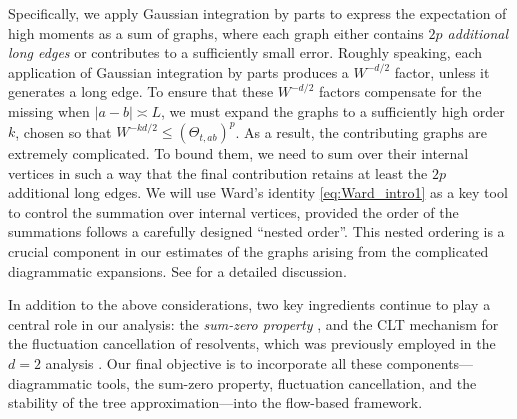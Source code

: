 Specifically, we apply Gaussian integration by parts to express the expectation of high moments  as a sum of graphs, where each graph either contains \emph{\( 2p \) additional long edges} or contributes to a sufficiently small error.   
Roughly speaking, each application of Gaussian integration by parts produces a \( W^{-d/2} \) factor, unless it generates a long edge.  
To ensure that these \( W^{-d/2} \) factors compensate for the missing  when \( |a-b| \asymp L \), we must expand the graphs to a sufficiently high order $k$, chosen so that \( W^{-kd/2} \le (\Theta_{t,ab})^{p} \). 
As a result, the contributing graphs are extremely complicated. To bound them, we need to sum over their internal vertices in such a way that the final contribution retains at least the \( 2p \) additional long edges. 
We will use Ward's identity \eqref{eq:Ward_intro1} as a key tool to control the summation over internal vertices, provided the order of the summations follows a carefully designed ``nested order''. This nested ordering is a crucial component in our estimates of the graphs arising from the complicated diagrammatic expansions. See  for a detailed discussion. 

In addition to the above considerations, two key ingredients continue to play a central role in our analysis: the \emph{sum-zero property} \cite{yang2021delocalization, yang2022delocalization,YY_25}, and the CLT mechanism for the fluctuation cancellation of resolvents, which was previously employed in the \( d = 2 \) analysis \cite{DYYY25}. Our final objective is to incorporate all these components---diagrammatic tools, the sum-zero property, fluctuation cancellation, and the stability of the tree approximation---into the flow-based framework.  

